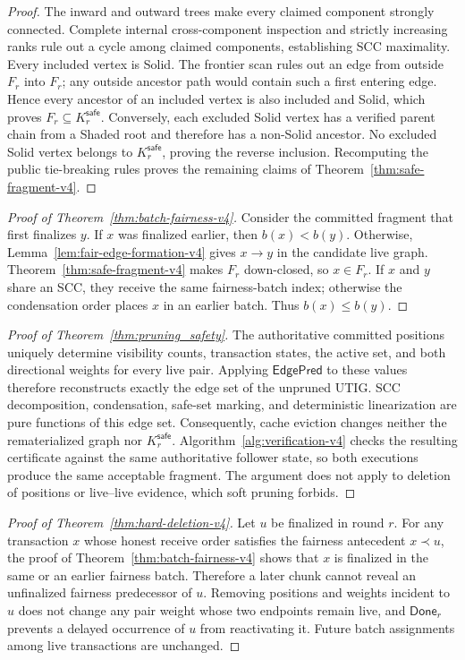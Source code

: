 \begin{proof}
The inward and outward trees make every claimed component strongly connected.
Complete internal cross-component inspection and strictly increasing ranks
rule out a cycle among claimed components, establishing SCC maximality.  Every
included vertex is Solid.  The frontier scan rules out an edge from outside
$F_r$ into $F_r$; any outside ancestor path would contain such a first entering
edge.  Hence every ancestor of an included vertex is also included and Solid,
which proves $F_r\subseteq K_r^{\mathsf{safe}}$.  Conversely, each excluded
Solid vertex has a verified parent chain from a Shaded root and therefore has
a non-Solid ancestor.  No excluded Solid vertex belongs to
$K_r^{\mathsf{safe}}$, proving the reverse inclusion.  Recomputing the public
tie-breaking rules proves the remaining claims of
Theorem~\ref{thm:safe-fragment-v4}.
\end{proof}

\begin{proof}[Proof of Theorem~\ref{thm:batch-fairness-v4}]
Consider the committed fragment that first finalizes $y$.  If $x$ was
finalized earlier, then $b(x)<b(y)$.  Otherwise,
Lemma~\ref{lem:fair-edge-formation-v4} gives $x\to y$ in the candidate live
graph.  Theorem~\ref{thm:safe-fragment-v4} makes $F_r$ down-closed, so
$x\in F_r$.  If $x$ and $y$ share an SCC, they receive the same fairness-batch
index; otherwise the condensation order places $x$ in an earlier batch.
Thus $b(x)\le b(y)$.
\end{proof}

\begin{proof}[Proof of Theorem~\ref{thm:pruning_safety}]
The authoritative committed positions uniquely determine visibility counts,
transaction states, the active set, and both directional weights for every
live pair.  Applying $\mathsf{EdgePred}$ to these values therefore reconstructs
exactly the edge set of the unpruned UTIG.  SCC decomposition, condensation,
safe-set marking, and deterministic linearization are pure functions of this
edge set.  Consequently, cache eviction changes neither the rematerialized
graph nor $K_r^{\mathsf{safe}}$.  Algorithm~\ref{alg:verification-v4} checks the
resulting certificate against the same authoritative follower state, so both
executions produce the same acceptable fragment.  The argument does not apply
to deletion of positions or live--live evidence, which soft pruning forbids.
\end{proof}

\begin{proof}[Proof of Theorem~\ref{thm:hard-deletion-v4}]
Let $u$ be finalized in round $r$.  For any transaction $x$ whose honest
receive order satisfies the fairness antecedent $x\prec u$, the proof of
Theorem~\ref{thm:batch-fairness-v4} shows that $x$ is finalized in the same or
an earlier fairness batch.  Therefore a later chunk cannot reveal an
unfinalized fairness predecessor of $u$.  Removing positions and weights
incident to $u$ does not change any pair weight whose two endpoints remain
live, and $\mathsf{Done}_r$ prevents a delayed occurrence of $u$ from
reactivating it.  Future batch assignments among live transactions are
unchanged.
\end{proof}

